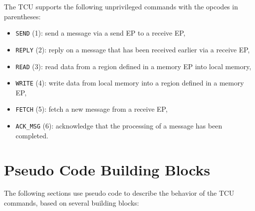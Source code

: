 The TCU supports the following unprivileged commands with the opcodes in parentheses:

\begin{itemize}
  \item \texttt{SEND} (1): send a message via a send EP to a receive EP,
  \item \texttt{REPLY} (2): reply on a message that has been received earlier via a receive EP,
  \item \texttt{READ} (3): read data from a region defined in a memory EP into local memory,
  \item \texttt{WRITE} (4): write data from local memory into a region defined in a memory EP,
  \item \texttt{FETCH} (5): fetch a new message from a receive EP,
  \item \texttt{ACK\_MSG} (6): acknowledge that the processing of a message has been completed.
\end{itemize}

\section{Pseudo Code Building Blocks}
\label{sec:unprivcmdspseudo}

The following sections use pseudo code to describe the behavior of the TCU commands, based on
several building blocks:

